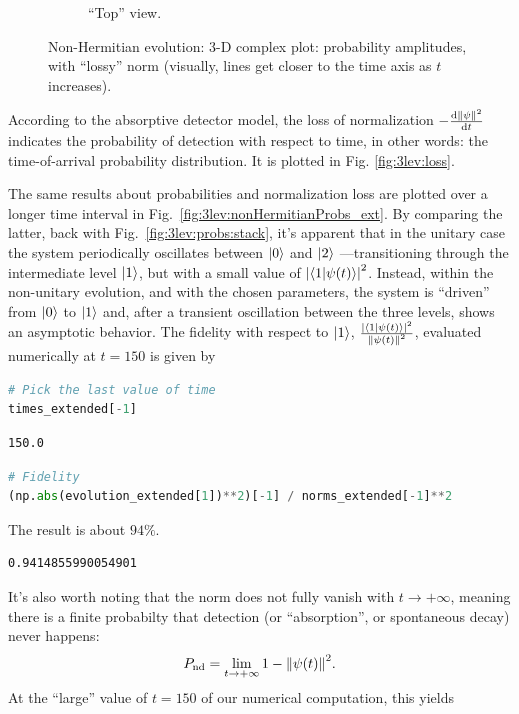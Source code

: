 \begin{figure}[h]
\begin{subfigure}[b]{\textwidth}
    \caption{``Top'' view.}
  \end{subfigure}
  \caption{
    Non-Hermitian evolution: 3-D complex plot: probability amplitudes, with ``lossy''
    norm (visually, lines get closer to the time axis as $t$ increases).
  }
  \label{fig:3lev:nonHermitianEvol}
\end{figure}

According to the absorptive detector model, the loss of normalization
$-\dv{\norm{\psi}^2}{t}$ indicates the probability of detection
with respect to time, in other words: the time-of-arrival
probability distribution. It is plotted in Fig. \ref{fig:3lev:loss}.

The same results
about probabilities and normalization loss
are plotted
over a longer time interval
in Fig.~\ref{fig:3lev:nonHermitianProbs_ext}.
By comparing the latter,
back with Fig.~\ref{fig:3lev:probs:stack},
it's apparent that in the unitary case the system
periodically oscillates between $\ket{0}$ and $\ket{2}$
---transitioning through the intermediate level $\ket{1}$,
but with a small value of $\abs{\braket{1}{\psi(t)}}^2$.
Instead, within the non-unitary evolution, and with the chosen parameters,
the system is ``driven'' from $\ket{0}$ to $\ket{1}$ and,
after a transient oscillation between the three levels,
shows an asymptotic behavior.
The fidelity with respect to $\ket{1}$,
$\frac{\abs{\braket{1}{\psi(t)}}^2}{\norm{\psi(t)}^2}$,
evaluated numerically at $t=150$ is given by
\begin{lstlisting}[language=Python]
# Pick the last value of time
times_extended[-1]
\end{lstlisting}
\begin{lstlisting}
150.0
\end{lstlisting}
\begin{lstlisting}[language=Python]
# Fidelity
(np.abs(evolution_extended[1])**2)[-1] / norms_extended[-1]**2
\end{lstlisting}
The result is about $94\%$.
\begin{lstlisting}
0.9414855990054901
\end{lstlisting}
It's also worth noting that the norm does not fully vanish with $t \rightarrow +\infty$,
meaning there is a finite probabilty that detection (or ``absorption'', or spontaneous decay) never happens:
\begin{equation*}
  P_{\mathrm{nd}} = \lim_{t \rightarrow +\infty} 1 - \norm{\psi(t)}^2 \text{.}
\end{equation*}
At the ``large'' value of $t=150$ of our numerical computation, this yields

